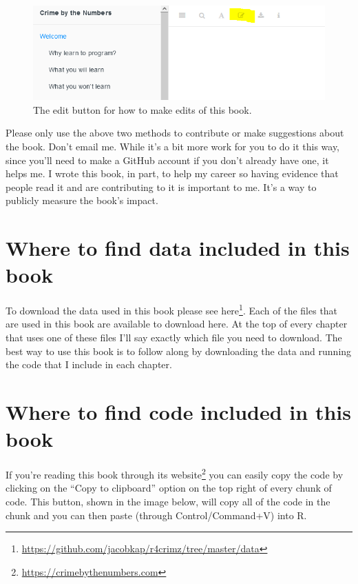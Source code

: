 \documentclass[
]{krantz}
\renewcommand{\href}[2]{#2\footnote{\url{#1}}}
\begin{document}
\begin{figure}

{\centering \includegraphics[width=0.9\linewidth]{images/edit_button} 

}

\caption{The edit button for how to make edits of this book.}\label{fig:unnamed-chunk-1}
\end{figure}

Please only use the above two methods to contribute or make suggestions about the book. Don't email me. While it's a bit more work for you to do it this way, since you'll need to make a GitHub account if you don't already have one, it helps me. I wrote this book, in part, to help my career so having evidence that people read it and are contributing to it is important to me. It's a way to publicly measure the book's impact.

\hypertarget{where-to-find-data-included-in-this-book}{%
\section{Where to find data included in this book}\label{where-to-find-data-included-in-this-book}}

To download the data used in this book please see \href{https://github.com/jacobkap/r4crimz/tree/master/data}{here}. Each of the files that are used in this book are available to download here. At the top of every chapter that uses one of these files I'll say exactly which file you need to download. The best way to use this book is to follow along by downloading the data and running the code that I include in each chapter.

\hypertarget{where-to-find-code-included-in-this-book}{%
\section{Where to find code included in this book}\label{where-to-find-code-included-in-this-book}}

If you're reading this book through its \href{https://crimebythenumbers.com}{website} you can easily copy the code by clicking on the ``Copy to clipboard'' option on the top right of every chunk of code. This button, shown in the image below, will copy all of the code in the chunk and you can then paste (through Control/Command+V) into R.
\end{document}
